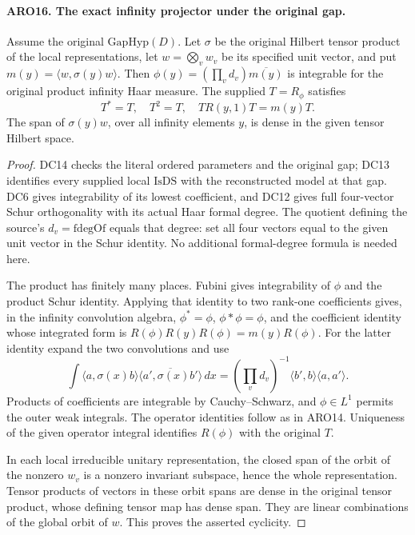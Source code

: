 \paragraph{ARO16. The exact infinity projector under the original gap.}
\label{claim:ARO16}
Assume the original \(\mathrm{GapHyp}(D)\).  Let \(\sigma\) be
the original Hilbert tensor product of the local representations,
let \(w=\bigotimes_vw_v\) be its specified unit vector, and put
\(m(y)=\langle w,\sigma(y)w\rangle\).  Then
\(\phi(y)=(\prod_vd_v)\overline{m(y)}\) is integrable for the
original product infinity Haar measure.  The supplied
\(T=R_\phi\) satisfies
\[
 T^*=T,\quad T^2=T,\quad
                 T R(y,1)T=m(y)T.                    \tag{ARO.19}
\]
The span of \(\sigma(y)w\), over all infinity elements \(y\),
is dense in the given tensor Hilbert space.
\begin{proof}
DC14 checks the literal ordered parameters and the original gap;
DC13 identifies every supplied local \(\mathrm{IsDS}\) with the
reconstructed model at that gap.  DC6 gives integrability of its
lowest coefficient, and DC12 gives full four-vector Schur
orthogonality with its actual Haar formal degree.  The quotient
defining the source's \(d_v=\mathrm{fdegOf}\) equals that degree:
set all four vectors equal to the given unit vector in the Schur
identity.  No additional formal-degree formula is needed here.

The product has finitely many places.  Fubini gives integrability
of \(\phi\) and the product Schur identity.  Applying that identity
to two rank-one coefficients gives, in the infinity convolution
algebra,
\(\phi^*=\phi\), \(\phi*\phi=\phi\), and the coefficient identity
whose integrated form is \(R(\phi)R(y)R(\phi)=m(y)R(\phi)\).
For the latter identity expand the two convolutions and use
\[
 \int\langle a,\sigma(x)b\rangle
             \overline{\langle a',\sigma(x)b'\rangle}\,dx
  = (\prod_vd_v)^{-1}\langle b',b\rangle\langle a,a'\rangle.
\]
Products of coefficients are integrable by Cauchy--Schwarz, and
\(\phi\in L^1\) permits the outer weak integrals.  The operator
identities follow as in ARO14.  Uniqueness of the given operator
integral identifies \(R(\phi)\) with the original \(T\).

In each local irreducible unitary representation, the closed span
of the orbit of the nonzero \(w_v\) is a nonzero invariant subspace,
hence the whole representation.  Tensor products of vectors in
these orbit spans are dense in the original tensor product, whose
defining tensor map has dense span.  They are linear combinations
of the global orbit of \(w\).  This proves the asserted cyclicity.
\end{proof}


